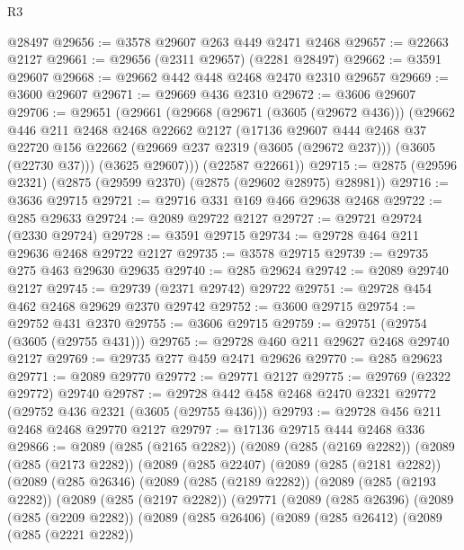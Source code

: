 \begin{lexlean}{R3}
\begin{coremodule}
    @28497
@29656 := @3578 @29607 @263 @449 @2471 @2468
@29657 := @22663 @2127
@29661 := @29656 (@2311 @29657) (@2281 @28497)
@29662 := @3591 @29607
@29668 := @29662 @442 @448 @2468 @2470 @2310 @29657
@29669 := @3600 @29607
@29671 := @29669 @436 @2310
@29672 := @3606 @29607
@29706 := @29651
    (@29661
      (@29668
        (@29671 (@3605 (@29672 @436)))
        (@29662
          @446
          @211
          @2468
          @2468
          @22662
          @2127
          (@17136
            @29607
            @444
            @2468
            @37
            @22720
            @156
            @22662
            (@29669 @237 @2319 (@3605 (@29672 @237)))
            (@3605 (@22730 @37)))
          (@3625 @29607)))
      (@22587 @22661))
@29715 := @2875 (@29596 @2321) (@2875 (@29599 @2370) (@2875 (@29602 @28975) @28981))
@29716 := @3636 @29715
@29721 := @29716 @331 @169 @466 @29638 @2468
@29722 := @285 @29633
@29724 := @2089 @29722 @2127
@29727 := @29721 @29724 (@2330 @29724)
@29728 := @3591 @29715
@29734 := @29728 @464 @211 @29636 @2468 @29722 @2127
@29735 := @3578 @29715
@29739 := @29735 @275 @463 @29630 @29635
@29740 := @285 @29624
@29742 := @2089 @29740 @2127
@29745 := @29739 (@2371 @29742) @29722
@29751 := @29728 @454 @462 @2468 @29629 @2370 @29742
@29752 := @3600 @29715
@29754 := @29752 @431 @2370
@29755 := @3606 @29715
@29759 := @29751 (@29754 (@3605 (@29755 @431)))
@29765 := @29728 @460 @211 @29627 @2468 @29740 @2127
@29769 := @29735 @277 @459 @2471 @29626
@29770 := @285 @29623
@29771 := @2089 @29770
@29772 := @29771 @2127
@29775 := @29769 (@2322 @29772) @29740
@29787 := @29728 @442 @458 @2468 @2470 @2321 @29772 (@29752 @436 @2321 (@3605 (@29755 @436)))
@29793 := @29728 @456 @211 @2468 @2468 @29770 @2127
@29797 := @17136 @29715 @444 @2468 @336
@29866 := @2089
    (@285 (@2165 @2282))
    (@2089
      (@285 (@2169 @2282))
      (@2089
        (@285 (@2173 @2282))
        (@2089
          (@285 @22407)
          (@2089
            (@285 (@2181 @2282))
            (@2089
              (@285 @26346)
              (@2089
                (@285 (@2189 @2282))
                (@2089
                  (@285 (@2193 @2282))
                  (@2089
                    (@285 (@2197 @2282))
                    (@29771
                      (@2089
                        (@285 @26396)
                        (@2089
                          (@285 (@2209 @2282))
                          (@2089
                            (@285 @26406)
                            (@2089
                              (@285 @26412)
                              (@2089
                                (@285 (@2221 @2282))

\end{coremodule}
\end{lexlean}
